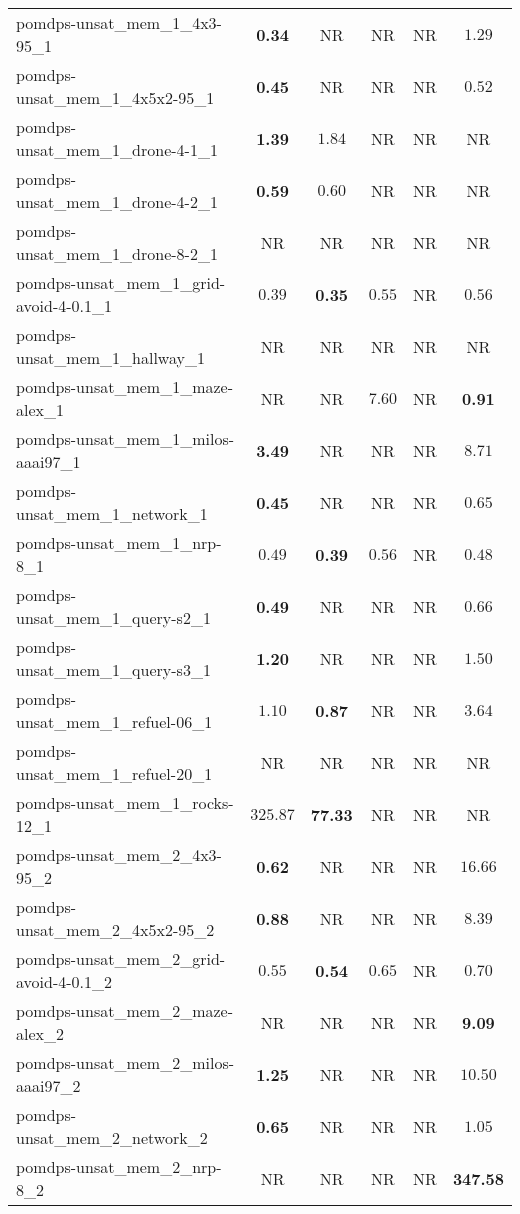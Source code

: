 \begin{tabular}{lccccc}
pomdps-unsat\_mem\_1\_4x3-95\_1 & \textbf{0.34} & NR & NR & NR & $1.29$ \\
pomdps-unsat\_mem\_1\_4x5x2-95\_1 & \textbf{0.45} & NR & NR & NR & $0.52$ \\
pomdps-unsat\_mem\_1\_drone-4-1\_1 & \textbf{1.39} & $1.84$ & NR & NR & NR \\
pomdps-unsat\_mem\_1\_drone-4-2\_1 & \textbf{0.59} & $0.60$ & NR & NR & NR \\
pomdps-unsat\_mem\_1\_drone-8-2\_1 & NR & NR & NR & NR & NR \\
pomdps-unsat\_mem\_1\_grid-avoid-4-0.1\_1 & $0.39$ & \textbf{0.35} & $0.55$ & NR & $0.56$ \\
pomdps-unsat\_mem\_1\_hallway\_1 & NR & NR & NR & NR & NR \\
pomdps-unsat\_mem\_1\_maze-alex\_1 & NR & NR & $7.60$ & NR & \textbf{0.91} \\
pomdps-unsat\_mem\_1\_milos-aaai97\_1 & \textbf{3.49} & NR & NR & NR & $8.71$ \\
pomdps-unsat\_mem\_1\_network\_1 & \textbf{0.45} & NR & NR & NR & $0.65$ \\
pomdps-unsat\_mem\_1\_nrp-8\_1 & $0.49$ & \textbf{0.39} & $0.56$ & NR & $0.48$ \\
pomdps-unsat\_mem\_1\_query-s2\_1 & \textbf{0.49} & NR & NR & NR & $0.66$ \\
pomdps-unsat\_mem\_1\_query-s3\_1 & \textbf{1.20} & NR & NR & NR & $1.50$ \\
pomdps-unsat\_mem\_1\_refuel-06\_1 & $1.10$ & \textbf{0.87} & NR & NR & $3.64$ \\
pomdps-unsat\_mem\_1\_refuel-20\_1 & NR & NR & NR & NR & NR \\
pomdps-unsat\_mem\_1\_rocks-12\_1 & $325.87$ & \textbf{77.33} & NR & NR & NR \\
pomdps-unsat\_mem\_2\_4x3-95\_2 & \textbf{0.62} & NR & NR & NR & $16.66$ \\
pomdps-unsat\_mem\_2\_4x5x2-95\_2 & \textbf{0.88} & NR & NR & NR & $8.39$ \\
pomdps-unsat\_mem\_2\_grid-avoid-4-0.1\_2 & $0.55$ & \textbf{0.54} & $0.65$ & NR & $0.70$ \\
pomdps-unsat\_mem\_2\_maze-alex\_2 & NR & NR & NR & NR & \textbf{9.09} \\
pomdps-unsat\_mem\_2\_milos-aaai97\_2 & \textbf{1.25} & NR & NR & NR & $10.50$ \\
pomdps-unsat\_mem\_2\_network\_2 & \textbf{0.65} & NR & NR & NR & $1.05$ \\
pomdps-unsat\_mem\_2\_nrp-8\_2 & NR & NR & NR & NR & \textbf{347.58} \\

\end{tabular}
